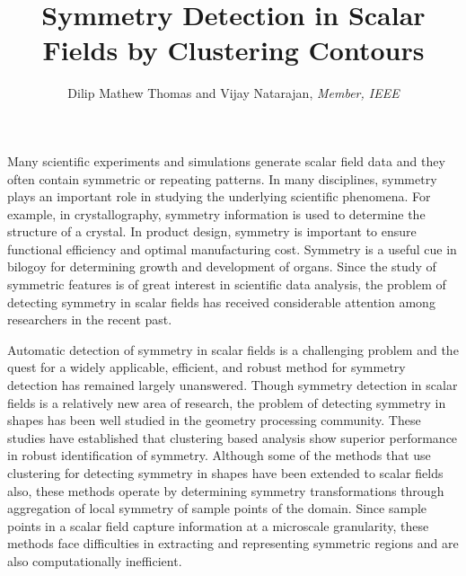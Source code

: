 \documentclass[review,journal]{vgtc}         %
\title{Symmetry Detection in Scalar Fields by Clustering Contours}
\author{Dilip Mathew Thomas and Vijay Natarajan, \textit{Member, IEEE}}
\begin{document}

\maketitle
Many scientific experiments and simulations generate scalar field data and 
they often contain symmetric or repeating patterns. In many disciplines, 
symmetry plays an important role in studying the underlying scientific phenomena. 
For example, in crystallography, symmetry information is used to determine 
the structure of a crystal. In product design, symmetry is important to ensure
functional efficiency and optimal manufacturing cost. Symmetry is a 
useful cue in bilogoy for determining growth and development of organs. Since 
the study of symmetric features is of great interest in scientific data 
analysis, the problem of detecting symmetry in scalar fields has received 
considerable attention among researchers in the recent past.

Automatic detection of symmetry in scalar fields is a challenging problem and 
the quest for a widely applicable, efficient, and robust method for symmetry 
detection has remained largely unanswered. Though symmetry detection in scalar
fields is a relatively new area of research, the problem of detecting symmetry
in shapes has been well studied in the geometry processing community.
These studies have established that clustering based analysis show superior
performance in robust identification of symmetry. Although some of the methods
that use clustering for detecting symmetry in shapes have been extended to
scalar fields also, these methods operate by determining symmetry
transformations through aggregation of local symmetry of sample points of the
domain. Since sample points in a scalar field capture information at a
microscale granularity, these methods face difficulties in extracting and
representing symmetric regions and are also computationally inefficient.
\end{document}
